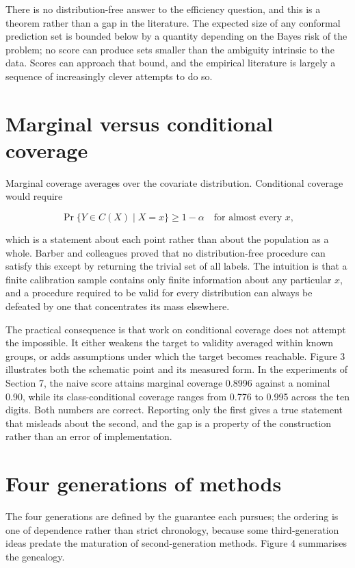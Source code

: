 There is no distribution-free answer to the efficiency question, and this is a
theorem rather than a gap in the literature. The expected size of any conformal
prediction set is bounded below by a quantity depending on the Bayes risk of the
problem; no score can produce sets smaller than the ambiguity intrinsic to the
data. Scores can approach that bound, and the empirical literature is largely a
sequence of increasingly clever attempts to do so.

\section{Marginal versus conditional coverage}

Marginal coverage averages over the covariate distribution. Conditional coverage
would require

\begin{equation}
\Pr\{Y \in C(X) \mid X = x\} \geq 1-\alpha \quad \text{for almost every } x,
\end{equation}

which is a statement about each point rather than about the population as a whole.
Barber and colleagues \cite{Barber2021} proved that no distribution-free procedure
can satisfy this except by returning the trivial set of all labels. The intuition
is that a finite calibration sample contains only finite information about any
particular $x$, and a procedure required to be valid for every distribution can
always be defeated by one that concentrates its mass elsewhere.

The practical consequence is that work on conditional coverage does not attempt
the impossible. It either weakens the target to validity averaged within known
groups, or adds assumptions under which the target becomes reachable. Figure 3
illustrates both the schematic point and its measured form. In the experiments of
Section 7, the naive score attains marginal coverage 0.8996 against a nominal
0.90, while its class-conditional coverage ranges from 0.776 to 0.995 across the
ten digits. Both numbers are correct. Reporting only the first gives a true
statement that misleads about the second, and the gap is a property of the
construction rather than an error of implementation.

\section{Four generations of methods}

The four generations are defined by the guarantee each pursues; the ordering is
one of dependence rather than strict chronology, because some third-generation
ideas predate the maturation of second-generation methods. Figure 4 summarises the
genealogy.


